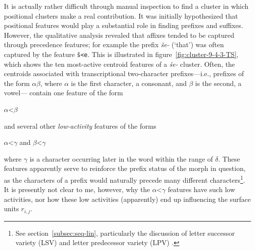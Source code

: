 It is actually rather difficult through manual inspection to find a cluster in which positional clusters make a real contribution. 
It was initially hypothesized that positional features would play a substantial role in
finding prefixes and suffixes. However, the qualitative analysis revealed that affixes tended to be captured through 
precedence features; for example the prefix \textit{\v{s}e-} (`that')  was often captured by the feature \texttt{\v{s}<e}. This is illustrated in figure~\ref{fig:cluster-9-4-3-TS}, which shows the ten most-active centroid features of a \textit{\v{s}e-} cluster.
 Often, the centroids associated with transcriptional two-character prefixes---i.e., prefixes of the form
$\alpha\beta$,
where $\alpha$ is the first character, a consonant, and $\beta$ is the second, a vowel---
contain one feature of the form 
\begin{center}
$\alpha$<$\beta$ 
\end{center}
and several other \emph{low-activity} features
of the forms 
\begin{center}
$\alpha$<$\gamma$ \quad and \quad $\beta$<$\gamma$  
\end{center}
where $\gamma$ is a character occurring later in the word within the range of $\delta$. These features apparently serve to reinforce the prefix status of the morph in question, as the characters of a prefix would naturally precede many different characters\footnote{See section~\ref{subsec:seq-lin}, particularly the discussion of letter successor variety (LSV) and letter predecessor variety (LPV) \citep{harris:1955, harris:1967}.}. It is presently not clear to me, however, why the $\alpha$<$\gamma$ features have such low activities, nor how these low activities (apparently) end up influencing the surface units $r_{i,j}$.

